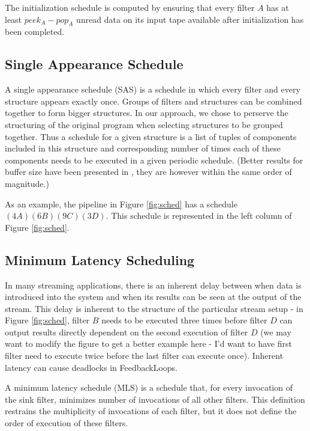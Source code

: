 The initialization schedule is computed by ensuring that every filter $A$ has
at least $peek_A - pop_A$ unread data on its input tape available after 
initialization has been completed.

\subsection{Single Appearance Schedule}

A single appearance schedule (SAS) is a schedule in which every filter
and every structure appears exactly once.  Groups of filters and
structures can be combined together to form bigger structures.  In our
approach, we chose to perserve the structuring of the original program
when selecting structures to be grouped together.  Thus a schedule for
a given structure is a list of tuples of components included in this
structure and corresponding number of times each of these components
needs to be executed in a given periodic schedule. (Better results for
buffer size have been presented in \cite{somepaper}, they are however
within the same order of magnitude.)

As an example, the pipeline in Figure \ref{fig:sched} has a schedule
$(4A)(6B)(9C)(3D)$.  This schedule is represented in the left column of
Figure \ref{fig:sched}.

\subsection{Minimum Latency Scheduling}

In many streaming applications, there is an inherent delay between when data
is introduced into the system and when its results can be seen at the output
of the stream.  This delay is inherent to the structure of the particular
stream setup - in Figure \ref{fig:sched}, filter $B$ needs to be executed
three times before filter $D$ can output results directly dependent on the
second execution of filter $D$ (we may want to modify the figure to get a
better example here - I'd want to have first filter need to execute twice 
before the last filter can execute once).  Inherent latency can cause 
deadlocks in FeedbackLoops. 

A minimum latency schedule (MLS) is a schedule that, for every invocation
of the sink filter, minimizes number of invocations of all other filters.
This definition restrains the multiplicity of invocations of each filter, 
but it does not define the order of execution of these filters.

